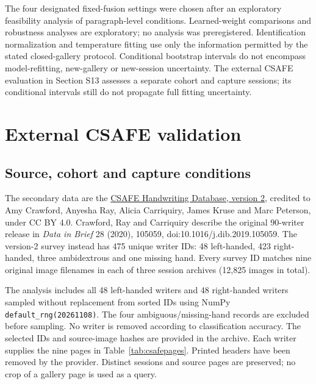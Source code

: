 \documentclass[10pt,a4paper]{article}
\begin{document}
The four designated fixed-fusion settings were chosen after an exploratory feasibility analysis of paragraph-level conditions. Learned-weight comparisons and robustness analyses are exploratory; no analysis was preregistered. Identification normalization and temperature fitting use only the information permitted by the stated closed-gallery protocol. Conditional bootstrap intervals do not encompass model-refitting, new-gallery or new-session uncertainty. The external CSAFE evaluation in Section S13 assesses a separate cohort and capture sessions; its conditional intervals still do not propagate full fitting uncertainty.

\section{External CSAFE validation}
\label{sec:csafesupplement}
\subsection{Source, cohort and capture conditions}
The secondary data are the \href{https://doi.org/10.25380/iastate.10062203.v2}{CSAFE Handwriting Database, version 2}, credited to Amy Crawford, Anyesha Ray, Alicia Carriquiry, James Kruse and Marc Peterson, under CC BY 4.0. Crawford, Ray and Carriquiry describe the original 90-writer release in \emph{Data in Brief} 28 (2020), 105059, doi:10.1016/j.dib.2019.105059. The version-2 survey instead has 475 unique writer IDs: 48 left-handed, 423 right-handed, three ambidextrous and one missing hand. Every survey ID matches nine original image filenames in each of three session archives (12,825 images in total).

The analysis includes all 48 left-handed writers and 48 right-handed writers sampled without replacement from sorted IDs using NumPy \texttt{default\_rng(20261108)}. The four ambiguous/missing-hand records are excluded before sampling. No writer is removed according to classification accuracy. The selected IDs and source-image hashes are provided in the archive. Each writer supplies the nine pages in Table~\ref{tab:csafepages}. Printed headers have been removed by the provider. Distinct sessions and source pages are preserved; no crop of a gallery page is used as a query.
\end{document}
